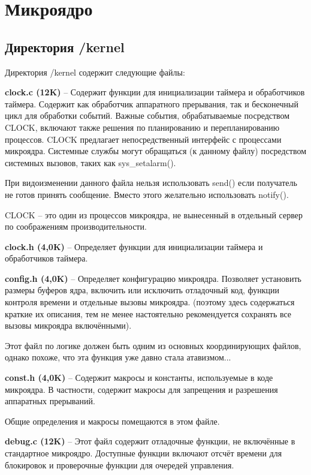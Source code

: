 \newpage
\section{Микроядро}

\subsection{Директория /kernel}

Директория /kernel содержит следующие файлы:

\textbf{clock.c (12K)} -- Содержит функции для инициализации таймера и обработчиков таймера. Содержит как обработчик аппаратного прерывания, так и бесконечный цикл для обработки событий. Важные события, обрабатываемые посредством CLOCK, включают также решения по планированию и перепланированию процессов. CLOCK предлагает непосредственный интерфейс с процессами микроядра. Системные службы могут обращаться (к данному файлу) посредством системных вызовов, таких как sys\_setalarm().

При видоизменении данного файла нельзя использовать send() если получатель не готов принять сообщение. Вместо этого желательно использовать notify().

CLOCK -- это один из процессов микроядра, не вынесенный в отдельный сервер по соображениям производительности.

\textbf{clock.h (4,0K)} -- Определяет функции для инициализации таймера и обработчиков таймера.

\textbf{config.h (4,0K)} -- Определяет конфигурацию микроядра. Позволяет установить размеры буферов ядра, включить или исключить отладочный код, функции контроля времени и отдельные вызовы микроядра. (поэтому здесь содержаться краткие их описания, тем не менее настоятельно рекомендуется сохранять все вызовы микроядра включёнными).

Этот файл по логике должен быть одним из основных координирующих файлов, однако похоже, что эта функция уже давно стала атавизмом...

\textbf{const.h (4,0K)} -- Содержит макросы и константы, используемые в коде микроядра. В частности, содержит макросы для запрещения и разрешения аппаратных прерываний.

Общие определения и макросы помещаются в этом файле.

\textbf{debug.c (12K)} -- Этот файл содержит отладочные функции, не включённые в стандартное микроядро. Доступные функции включают отсчёт времени для блокировок и проверочные функции для очередей управления.

